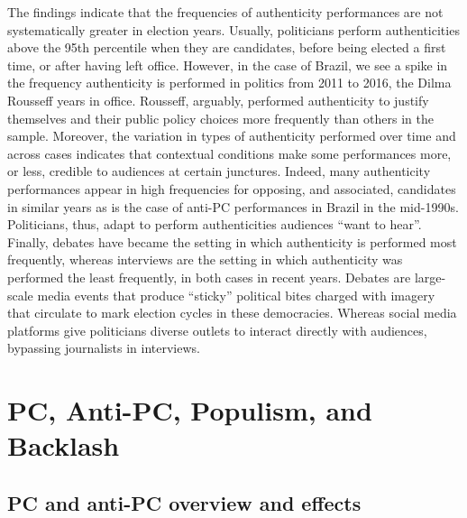 \documentclass[smallextended]{svjour3}       %
\begin{document}
The findings indicate that the frequencies of authenticity performances
are not systematically greater in election years. Usually, politicians
perform authenticities above the 95th percentile when they are
candidates, before being elected a first time, or after having left
office. However, in the case of Brazil, we see a spike in the frequency
authenticity is performed in politics from 2011 to 2016, the Dilma
Rousseff years in office. Rousseff, arguably, performed authenticity to
justify themselves and their public policy choices more frequently than
others in the sample. Moreover, the variation in types of authenticity
performed over time and across cases indicates that contextual
conditions make some performances more, or less, credible to audiences
at certain junctures. Indeed, many authenticity performances appear in
high frequencies for opposing, and associated, candidates in similar
years as is the case of anti-PC performances in Brazil in the mid-1990s.
Politicians, thus, adapt to perform authenticities audiences ``want to
hear''. Finally, debates have became the setting in which authenticity
is performed most frequently, whereas interviews are the setting in
which authenticity was performed the least frequently, in both cases in
recent years. Debates are large-scale media events that produce
``sticky'' political bites charged with imagery that circulate to mark
election cycles in these democracies. Whereas social media platforms
give politicians diverse outlets to interact directly with audiences,
bypassing journalists in interviews.

\hypertarget{pc-anti-pc-populism-and-backlash}{%
\section{PC, Anti-PC, Populism, and
Backlash}\label{pc-anti-pc-populism-and-backlash}}

\hypertarget{pc-and-anti-pc-overview-and-effects}{%
\subsection{PC and anti-PC overview and
effects}\label{pc-and-anti-pc-overview-and-effects}}
\end{document}
